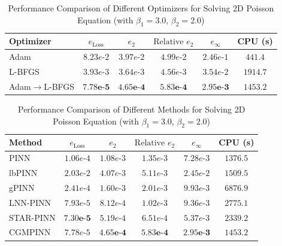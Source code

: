\documentclass{article}
\theoremstyle{plain}
\theoremstyle{definition}
\theoremstyle{remark}
\begin{document}
\begin{table}[t]
	\centering
	\caption{Performance Comparison of Different Optimizers for Solving 2D Poisson Equation (with $\beta_1 = 3.0$, $\beta_2 = 2.0$)}
	\label{tab:2d_poisson_beta_optimizer_performance}
	\begin{tabular}{lccccc}
		\toprule
		Optimizer & $e_{\text{Loss}}$ & $e_2$ & $\text{Relative } e_2$ & $e_\infty$ & CPU (s) \\
		\midrule
		Adam               & $8.23e\text{-}2$ & $3.97e\text{-}2$ & $4.99e\text{-}2$ & $2.46e\text{-}1$ & $441.4$   \\
		L-BFGS             & $3.93e\text{-}3$ & $3.64e\text{-}3$ & $4.56e\text{-}3$ & $3.54e\text{-}2$ & $1914.7$  \\
		Adam$\to$L-BFGS    & $\mathbf{7.78e\text{-}5}$ & $\mathbf{4.65e\text{-}4}$ & $\mathbf{5.83e\text{-}4}$ & $\mathbf{2.95e\text{-}3}$ & $1453.2$  \\
		\bottomrule
	\end{tabular}
\end{table}

\begin{table}[t]
	\centering
	\caption{Performance Comparison of Different Methods for Solving 2D Poisson Equation (with $\beta_1 = 3.0$, $\beta_2 = 2.0$)}
	\label{tab:2d_poisson_pinn_methods_performance}
	\begin{tabular}{lccccc}
		\toprule
		Method & $e_{\text{Loss}}$ & $e_2$ & $\text{Relative } e_2$ & $e_\infty$ & CPU (s) \\
		\midrule
		PINN               & $1.06e\text{-}4$ & $1.08e\text{-}3$ & $1.35e\text{-}3$ & $7.28e\text{-}3$ & $1376.5$   \\
		lbPINN             & $2.03e\text{-}2$ & $4.07e\text{-}3$ & $5.11e\text{-}3$ & $2.45e\text{-}2$ & $1509.5$   \\
		gPINN              & $2.41e\text{-}4$ & $1.60e\text{-}3$ & $2.01e\text{-}3$ & $9.93e\text{-}3$ & $6876.9$   \\
		LNN-PINN           & $7.93e\text{-}5$ & $8.12e\text{-}4$ & $1.02e\text{-}3$ & $9.36e\text{-}3$ & $2775.1$   \\
		STAR-PINN          & $\mathbf{7.30e\text{-}5}$ & $5.19e\text{-}4$ & $6.51e\text{-}4$ & $5.37e\text{-}3$ & $2339.2$   \\
		CGMPINN            & $7.78e\text{-}5$ & $\mathbf{4.65e\text{-}4}$ & $\mathbf{5.83e\text{-}4}$ & $\mathbf{2.95e\text{-}3}$ & $1453.2$   \\
		\bottomrule
	\end{tabular}
\end{table}
\end{document}

